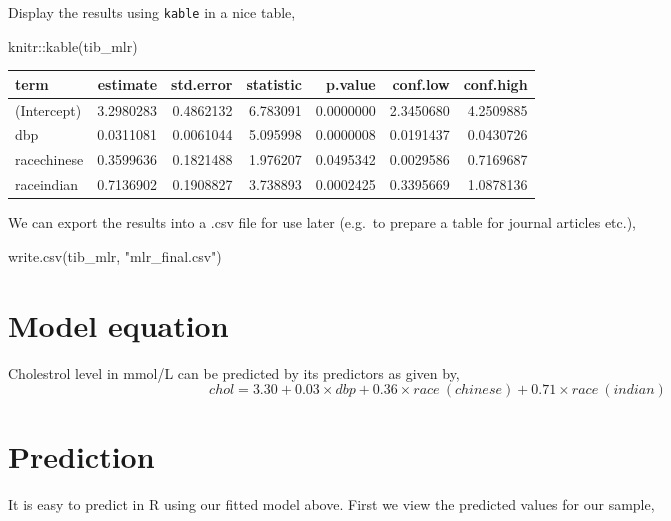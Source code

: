 \documentclass[
]{book}
\makeatletter
\newenvironment{Shaded}{\begin{snugshade}}{\end{snugshade}}
\newcommand{\FunctionTok}[1]{\textcolor[rgb]{0,0,0}{#1}}
\newcommand{\NormalTok}[1]{#1}
\newcommand{\SpecialCharTok}[1]{\textcolor[rgb]{0,0,0}{#1}}
\newcommand{\StringTok}[1]{\textcolor[rgb]{0.5,0.5,0.5}{#1}}
\newenvironment{kframe}{%
\medskip{}
\setlength{\fboxsep}{.8em}
 \def\at@end@of@kframe{}%
 \ifinner\ifhmode%
  \def\at@end@of@kframe{\end{minipage}}%
  \begin{minipage}{\columnwidth}%
 \fi\fi%
 \def\FrameCommand##1{\hskip\@totalleftmargin \hskip-\fboxsep
 \colorbox{shadecolor}{##1}\hskip-\fboxsep
     \hskip-\linewidth \hskip-\@totalleftmargin \hskip\columnwidth}%
 \MakeFramed {\advance\hsize-\width
   \@totalleftmargin\z@ \linewidth\hsize
   \@setminipage}}%
 {\par\unskip\endMakeFramed%
 \at@end@of@kframe}
\renewenvironment{Shaded}{\begin{kframe}}{\end{kframe}}
\makeatother
\begin{document}
Display the results using \texttt{kable} in a nice table,

\begin{Shaded}
\begin{Highlighting}[]
\NormalTok{knitr}\SpecialCharTok{::}\FunctionTok{kable}\NormalTok{(tib\_mlr)}
\end{Highlighting}
\end{Shaded}

\begin{tabular}{l|r|r|r|r|r|r}
\hline
term & estimate & std.error & statistic & p.value & conf.low & conf.high\\
\hline
(Intercept) & 3.2980283 & 0.4862132 & 6.783091 & 0.0000000 & 2.3450680 & 4.2509885\\
\hline
dbp & 0.0311081 & 0.0061044 & 5.095998 & 0.0000008 & 0.0191437 & 0.0430726\\
\hline
racechinese & 0.3599636 & 0.1821488 & 1.976207 & 0.0495342 & 0.0029586 & 0.7169687\\
\hline
raceindian & 0.7136902 & 0.1908827 & 3.738893 & 0.0002425 & 0.3395669 & 1.0878136\\
\hline
\end{tabular}

We can export the results into a .csv file for use later (e.g.~to prepare a table for journal articles etc.),

\begin{Shaded}
\begin{Highlighting}[]
\FunctionTok{write.csv}\NormalTok{(tib\_mlr, }\StringTok{"mlr\_final.csv"}\NormalTok{)}
\end{Highlighting}
\end{Shaded}

\hypertarget{model-equation-1}{%
\section{Model equation}\label{model-equation-1}}

Cholestrol level in mmol/L can be predicted by its predictors as given by,
\[chol = 3.30 + 0.03\times dbp + 0.36\times race\ (chinese) + 0.71\times race\ (indian)\]

\hypertarget{prediction}{%
\section{Prediction}\label{prediction}}

It is easy to predict in R using our fitted model above. First we view the predicted values for our sample,
\end{document}
